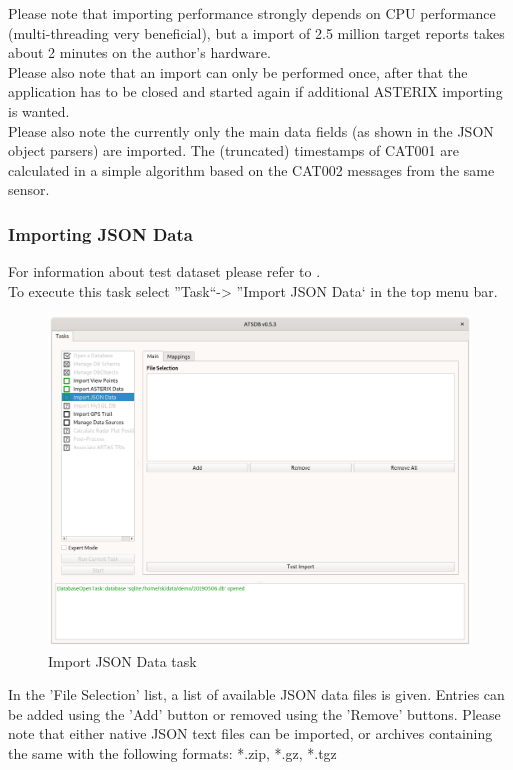 {Please note that importing performance strongly depends on CPU performance (multi-threading very beneficial), but a import of 2.5 million target reports takes about 2 minutes on the author's hardware. \\

Please also note that an import can only be performed once, after that the application has to be closed and started again if additional ASTERIX importing is wanted. \\

Please also note the currently only the main data fields (as shown in the JSON object parsers) are imported. The (truncated) timestamps of CAT001 are calculated in a simple algorithm based on the CAT002 messages from the same sensor.


\subsubsection{Importing JSON Data}
\label{sec:json_import}

For information about test dataset please refer to . \\

To execute this task select ''Task``->  ''Import JSON Data` in the top menu bar.

\begin{figure}[H]
  \center
    \includegraphics[width=14cm,frame]{../screenshots/import_json_data.png}
  \caption{Import JSON Data task}
\end{figure}

In the 'File Selection' list, a list of available JSON data files is given. Entries can be added using the 'Add' button or removed using the 'Remove' buttons. Please note that either native JSON text files can be imported, or archives containing the same with the following formats: *.zip, *.gz, *.tgz \\

}
